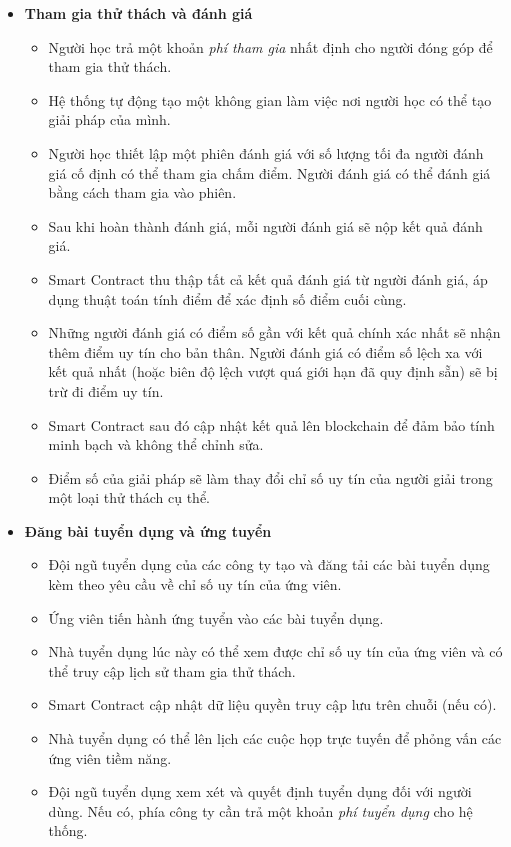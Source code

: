 \begin{itemize}
  \item \textbf{Tham gia thử thách và đánh giá}
        \begin{itemize}
          \item Người học trả một khoản \textit{phí tham gia} nhất định cho người đóng góp để tham gia thử thách.
          \item Hệ thống tự động tạo một không gian làm việc nơi người học có thể tạo giải pháp của mình.
          \item Người học thiết lập một phiên đánh giá với số lượng tối đa người đánh giá cố định có thể tham gia chấm điểm. Người đánh giá có thể đánh giá bằng cách tham gia vào phiên.
          \item Sau khi hoàn thành đánh giá, mỗi người đánh giá sẽ nộp kết quả đánh giá.
          \item Smart Contract thu thập tất cả kết quả đánh giá từ người đánh giá, áp dụng thuật toán tính điểm để xác định số điểm cuối cùng.
          \item Những người đánh giá có điểm số gần với kết quả chính xác nhất sẽ nhận thêm điểm uy tín cho bản thân. Người đánh giá có điểm số lệch xa với kết quả nhất (hoặc biên độ lệch vượt quá giới hạn đã quy định sẵn) sẽ bị trừ đi điểm uy tín.
          \item Smart Contract sau đó cập nhật kết quả lên blockchain để đảm bảo tính minh bạch và không thể chỉnh sửa.
          \item Điểm số của giải pháp sẽ làm thay đổi chỉ số uy tín của người giải trong một loại thử thách cụ thể.
        \end{itemize}

  \item \textbf{Đăng bài tuyển dụng và ứng tuyển}
        \begin{itemize}
          \item Đội ngũ tuyển dụng của các công ty tạo và đăng tải các bài tuyển dụng kèm theo yêu cầu về chỉ số uy tín của ứng viên.
          \item Ứng viên tiến hành ứng tuyển vào các bài tuyển dụng.
          \item Nhà tuyển dụng lúc này có thể xem được chỉ số uy tín của ứng viên và có thể truy cập lịch sử tham gia thử thách.
          \item Smart Contract cập nhật dữ liệu quyền truy cập lưu trên chuỗi (nếu có).
          \item Nhà tuyển dụng có thể lên lịch các cuộc họp trực tuyến để phỏng vấn các ứng viên tiềm năng.
          \item Đội ngũ tuyển dụng xem xét và quyết định tuyển dụng đối với người dùng. Nếu có, phía công ty cần trả một khoản \textit{phí tuyển dụng} cho hệ thống.
        \end{itemize}
\end{itemize}

